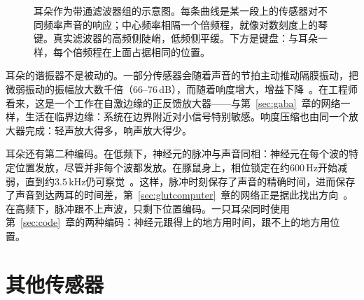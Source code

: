 \begin{figure}[t]
\centering
{}
\caption{耳朵作为带通滤波器组的示意图。每条曲线是某一段上的传感器对不同频率声音的响应；中心频率相隔一个倍频程，就像对数刻度上的琴键。真实滤波器的高频侧陡峭，低频侧平缓。下方是键盘：与耳朵一样，每个倍频程在上面占据相同的位置。}
\label{fig:filterbank}
\end{figure}

耳朵的谐振器不是被动的。一部分传感器会随着声音的节拍主动推动隔膜振动，把微弱振动的振幅放大数千倍（$66$--$76$\,dB），而随着响度增大，增益下降~\cite{Ruggero1997,Robles2001}。在工程师看来，这是一个工作在自激边缘的正反馈放大器——与第~\ref{sec:gaba}~章的网络一样，生活在临界边缘：系统在边界附近对小信号特别敏感。响度压缩也由同一个放大器完成：轻声放大得多，响声放大得少。

耳朵还有第二种编码。在低频下，神经元的脉冲与声音同相：神经元在每个波的特定位置发放，尽管并非每个波都发放。在豚鼠身上，相位锁定在约$600$\,Hz开始减弱，直到约$3.5$\,kHz仍可察觉~\cite{PalmerRussell1986}。这样，脉冲时刻保存了声音的精确时间，进而保存了声音到达两耳的时间差，第~\ref{sec:glutcomputer}~章的网络正是据此找出方向~\cite{Grothe2010}。在高频下，脉冲跟不上声波，只剩下位置编码。一只耳朵同时使用第~\ref{sec:code}~章的两种编码：神经元跟得上的地方用时间，跟不上的地方用位置。

\section{其他传感器}

